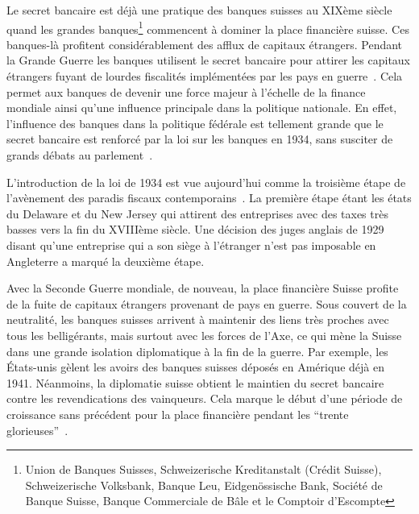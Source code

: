 \documentclass[a4paper, 11pt]{article}
\begin{document}
Le secret bancaire est déjà une
pratique des banques suisses au XIXème siècle quand les grandes
banques\footnote{Union de Banques Suisses, Schweizerische Kreditanstalt (Crédit
Suisse), Schweizerische Volksbank, Banque Leu, Eidgenössische Bank, Société de
Banque Suisse, Banque Commerciale de Bâle et le Comptoir d’Escompte} commencent
à dominer la place financière suisse. Ces banques-là profitent considérablement
des afflux de capitaux étrangers. Pendant la Grande Guerre les banques utilisent
le secret bancaire pour attirer les capitaux étrangers fuyant de lourdes
fiscalités implémentées par les pays en guerre~\citep[p. 484-486]{Mazbouri12}.
Cela permet aux banques de devenir une force majeur à l’échelle de la finance
mondiale ainsi qu’une influence principale dans la politique nationale.
En effet, l’influence des banques dans la politique fédérale est tellement
grande que le secret bancaire est renforcé par la loi sur les banques en 1934,
sans susciter de grands débats au parlement~\citep{Guex99}.


L'introduction de la loi de 1934 est vue aujourd'hui comme la troisième étape de
l'avènement des paradis fiscaux contemporains~\citep[p. 29]{Chavagneux12}. La
première étape étant les états du Delaware et du New Jersey qui attirent des
entreprises avec des taxes très basses vers la fin du XVIIIème siècle. Une
décision des juges anglais de 1929 disant qu'une entreprise qui a son siège à
l'étranger n'est pas imposable en Angleterre a marqué la deuxième étape.


Avec la Seconde Guerre mondiale, de nouveau, la place financière Suisse profite
de la fuite de capitaux étrangers provenant de pays en guerre. Sous couvert de
la neutralité, les banques suisses arrivent à maintenir des liens très proches
avec tous les belligérants, mais surtout avec les forces de l’Axe, ce qui mène
la Suisse dans une grande isolation diplomatique à la fin de la guerre. Par
exemple, les États-unis gèlent les avoirs des banques suisses déposés en
Amérique déjà en 1941. Néanmoins, la diplomatie suisse obtient le maintien du
secret bancaire contre les revendications des vainqueurs. Cela marque le début
d’une période de croissance sans précédent pour la place financière pendant les
 ``trente glorieuses''~\citep[p. 495]{Mazbouri12}.
\end{document}
